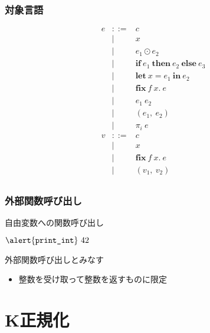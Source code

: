 \documentclass[dvipdfmx,cjk,xcolor=dvipsnames,envcountsect,notheorems,12pt]{beamer}
\theoremstyle{definition}
\newcommand{\keyword}[1]{\mathbf{#1}}
\newcommand{\LET}{\keyword{let}}
\newcommand{\IF}{\keyword{if}}
\newcommand{\THEN}{\keyword{then}}
\newcommand{\ELSE}{\keyword{else}}
\newcommand{\FIX}{\keyword{fix}}
\newcommand{\IN}{\keyword{in}}
\begin{document}
\begin{frame}
	\frametitle{対象言語}
	{\normalsize
	\[ \begin{array}{lcl}
		e & ::= & c	\\
				& | & x	\\
				& | & e_1 \odot e_2 \\
				& | & \IF~e_1~\THEN~e_2~\ELSE~e_3 \\
				& | & \LET~x=e_1~\IN~e_2 \\
				& | & \FIX~f~x.~e \\
				& | & e_1~e_2 \\
				& | & (e_1,~e_2) \\
				& | & \pi_i~e \\
			v & ::= & c \\
				& | & x \\
				& | & \FIX~f~x.~e \\
				& | & (v_1,~v_2) \\
	\end{array} \]}
\end{frame}

\begin{frame}
	\frametitle{外部関数呼び出し}
	\LARGE \alert{自由変数}への関数呼び出し

	\vfill

	\begin{center}
		\Large
		$ \alert{\texttt{print\_int}}~42 $
	\end{center}

	\vfill

	外部関数呼び出しとみなす
	\begin{itemize}
		\item 整数を受け取って整数を返すものに限定
	\end{itemize}
\end{frame}

\section{K正規化}
\end{document}
